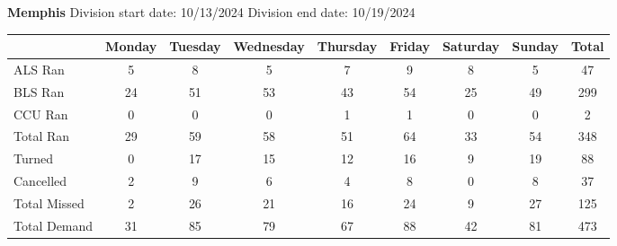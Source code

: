 \documentclass{article}
\begin{document}
\textbf{ Memphis }
Division start date: 10/13/2024
Division end date: 10/19/2024

\begin{longtable}{l|cccccccc}
\toprule
 & Monday & Tuesday & Wednesday & Thursday & Friday & Saturday & Sunday & Total \\
\midrule

ALS Ran & 
5 & 
8 & 
5 & 
7 & 
9 & 
8 & 
5 & 
47 \\

BLS Ran & 
24 & 
51 & 
53 & 
43 & 
54 & 
25 & 
49 & 
299 \\

CCU Ran & 
0 & 
0 & 
0 & 
1 & 
1 & 
0 & 
0 & 
2 \\

Total Ran & 
29 & 
59 & 
58 & 
51 & 
64 & 
33 & 
54 & 
348 \\

Turned & 
0 & 
17 & 
15 & 
12 & 
16 & 
9 & 
19 & 
88 \\

Cancelled & 
2 & 
9 & 
6 & 
4 & 
8 & 
0 & 
8 & 
37 \\

Total Missed & 
2 & 
26 & 
21 & 
16 & 
24 & 
9 & 
27 & 
125 \\

Total Demand & 
31 & 
85 & 
79 & 
67 & 
88 & 
42 & 
81 & 
473 \\

\bottomrule
\end{longtable}
\end{document}
